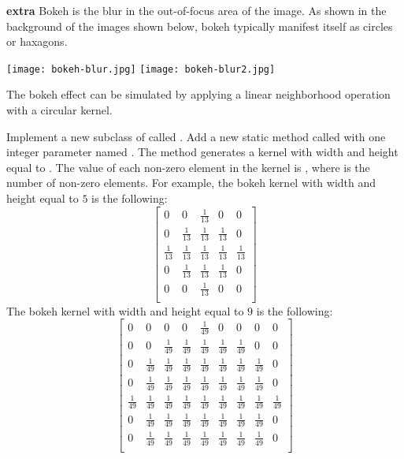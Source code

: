 \documentclass{book}
\begin{document}
\begin{exercise}\textbf{extra}
Bokeh is the blur in the out-of-focus area of the image. As shown in the background of the images shown below, bokeh typically manifest itself as circles or haxagons.
\begin{center}
\texttt{[image: bokeh-blur.jpg]}
\texttt{[image: bokeh-blur2.jpg]}
\end{center}
The bokeh effect can be simulated by applying a linear neighborhood operation with a circular kernel.

Implement a new subclass of  called . Add a new static method called  with one integer parameter named . The method generates a kernel with width and height equal to . The value of each non-zero element in the kernel is , where  is the number of non-zero elements. For example, the bokeh kernel with width and height equal to $5$ is the following:
  $$
 \begin{bmatrix}
0 & 0 & \frac{1}{13} & 0 & 0\\
0 & \frac{1}{13} & \frac{1}{13} & \frac{1}{13} & 0\\
\frac{1}{13} & \frac{1}{13} & \frac{1}{13} & \frac{1}{13} & \frac{1}{13}\\
0 & \frac{1}{13} & \frac{1}{13} & \frac{1}{13} & 0 \\
0 & 0 & \frac{1}{13} & 0 & 0 \\
 \end{bmatrix}
$$
The bokeh kernel with width and height equal to $9$ is the following:
$$
 \begin{bmatrix}
0 & 0 & 0 & 0 & \frac{1}{49} & 0 & 0 & 0 & 0\\
0 & 0 & \frac{1}{49} & \frac{1}{49} & \frac{1}{49} & \frac{1}{49} & \frac{1}{49} & 0 & 0\\
0 & \frac{1}{49} & \frac{1}{49} & \frac{1}{49} & \frac{1}{49} & \frac{1}{49} & \frac{1}{49} & \frac{1}{49} & 0\\
0 & \frac{1}{49} & \frac{1}{49} & \frac{1}{49} & \frac{1}{49} & \frac{1}{49} & \frac{1}{49} & \frac{1}{49} & 0\\
\frac{1}{49} & \frac{1}{49} & \frac{1}{49} & \frac{1}{49} & \frac{1}{49} & \frac{1}{49} & \frac{1}{49} & \frac{1}{49} & \frac{1}{49}\\
0 & \frac{1}{49} & \frac{1}{49} & \frac{1}{49} & \frac{1}{49} & \frac{1}{49} & \frac{1}{49} & \frac{1}{49} & 0\\
0 & \frac{1}{49} & \frac{1}{49} & \frac{1}{49} & \frac{1}{49} & \frac{1}{49} & \frac{1}{49} & \frac{1}{49} & 0\\

\end{bmatrix}$$
\end{exercise}
\end{document}
